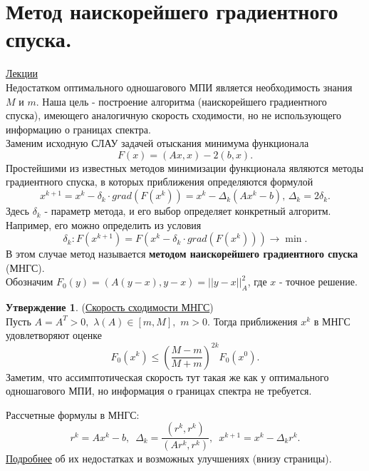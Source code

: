 \documentclass[specialist, subf, href, colorlinks=true, 12pt, times, mtpro, final]{disser}
\theoremstyle{definition}
\newtheorem{state}{Утверждение}[section]
\begin{document}
\section {Метод наискорейшего градиентного спуска.}
	\hyperlink {lects.68}{Лекции}\\
	Недостатком оптимального одношагового МПИ является необходимость знания $M$ и $m$.
	Наша цель - построение алгоритма (наискорейшего градиентного спуска), имеющего
	аналогичную скорость сходимости, но не использующего информацию о границах спектра.\\
	Заменим исходную СЛАУ задачей отыскания минимума функционала
	$$
	   F(x) = (Ax, x) - 2(b,x).
    $$
    Простейшими из известных методов минимизации функционала являются методы градиентного
    спуска, в которых приближения определяются формулой
    $$
        x^{k+1} = x^k - \delta_k\cdot grad(F(x^k)) = x^k - \Delta_k (Ax^k - b), \,
        \Delta_k = 2\delta_k.
    $$
    Здесь $\delta_k$ - параметр метода, и его выбор определяет конкретный алгоритм.
    Например, его можно определить из условия
    $$
        \delta_k: F(x^{k+1}) = F(x^k - \delta_k\cdot grad(F(x^k))) \rightarrow \min.
    $$
    В этом случае метод называется {\bf методом наискорейшего градиентного спуска} (МНГС).\\
    Обозначим $F_0(y) = (A(y-x), y-x) = ||y-x||_A^2$, где $x$ - точное решение.
    \begin{state} (\hyperlink {lects.69}{Скорость сходимости МНГС})\\
	Пусть $A = A^T > 0, \,\, \lambda(A) \in [m, M], \,\, m > 0$. Тогда приближения $x^k$
	в МНГС удовлетворяют оценке
	$$
	    F_0(x^k) \le \left(\frac{M-m}{M+m}\right)^{2k}F_0(x^0).
	$$
	Заметим, что ассимптотическая скорость тут такая же как у оптимального одношагового МПИ,
	но информация о границах спектра не требуется.
	\end{state}
	Рассчетные формулы в МНГС:
	$$
	    r^k = Ax^k - b,\,\,\, \Delta_k = \frac{(r^k, r^k)}{(Ar^k, r^k)}, \,\,\,
	    x^{k+1} = x^k - \Delta_k r^{k}.
	$$
	\hyperlink {lects.70}{Подробнее} об их недостатках и возможных улучшениях
	(внизу страницы).
\end{document}
